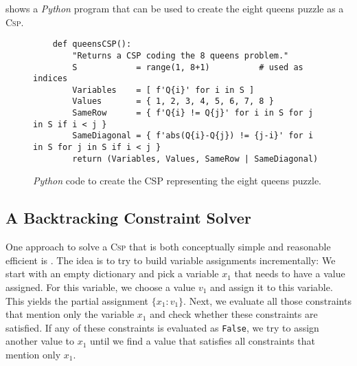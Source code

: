  shows a \textsl{Python} program that can be used to create the eight queens puzzle as a
\textsc{Csp}.  

\begin{figure}[!ht]
\centering
\begin{verbatim}
    def queensCSP():
        "Returns a CSP coding the 8 queens problem."
        S            = range(1, 8+1)          # used as indices
        Variables    = [ f'Q{i}' for i in S ]
        Values       = { 1, 2, 3, 4, 5, 6, 7, 8 }
        SameRow      = { f'Q{i} != Q{j}' for i in S for j in S if i < j }
        SameDiagonal = { f'abs(Q{i}-Q{j}) != {j-i}' for i in S for j in S if i < j }
        return (Variables, Values, SameRow | SameDiagonal)
\end{verbatim}
\vspace*{-0.3cm}
\caption{\textsl{Python} code to create the CSP representing the eight queens puzzle.}
\label{fig:queens-csp.stlx}
\end{figure}


\subsection{A Backtracking Constraint Solver}
One approach to solve a \textsc{Csp} that is both conceptually simple and reasonable efficient is
.  The idea is to try to build variable assignments incrementally:  We start with
an empty dictionary and pick a variable $x_1$ that needs to have a value assigned.  For this variable, we
choose a value $v_1$ and assign it to this variable.  This yields the partial assignment $\{ x_1:v_1 \}$.
Next, we evaluate all those constraints that mention only the variable $x_1$ and check whether these constraints
are satisfied.  If any of these constraints is evaluated as \texttt{False}, we try to assign another value to
$x_1$ until we find a value that satisfies all constraints that mention only $x_1$.

